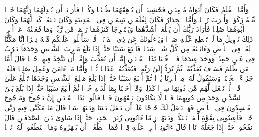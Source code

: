 \stopbuffer
\startbuffer[\q:18:80]
وَأَمَّا ٱلۡغُلَٰمُ فَكَانَ أَبَوَاهُ مُؤۡمِنَیۡنِ فَخَشِینَاۤ أَن یُرۡهِقَهُمَا طُغۡیَٰنࣰا وَكُفۡرࣰا%
\stopbuffer
\startbuffer[\q:18:81]
فَأَرَدۡنَاۤ أَن یُبۡدِلَهُمَا رَبُّهُمَا خَیۡرࣰا مِّنۡهُ زَكَوٰةࣰ وَأَقۡرَبَ رُحۡمࣰا%
\stopbuffer
\startbuffer[\q:18:82]
وَأَمَّا ٱلۡجِدَارُ فَكَانَ لِغُلَٰمَیۡنِ یَتِیمَیۡنِ فِی ٱلۡمَدِینَةِ وَكَانَ تَحۡتَهُۥ كَنزࣱ لَّهُمَا وَكَانَ أَبُوهُمَا صَٰلِحࣰا فَأَرَادَ رَبُّكَ أَن یَبۡلُغَاۤ أَشُدَّهُمَا وَیَسۡتَخۡرِجَا كَنزَهُمَا رَحۡمَةࣰ مِّن رَّبِّكَۚ وَمَا فَعَلۡتُهُۥ عَنۡ أَمۡرِیۚ ذَٰلِكَ تَأۡوِیلُ مَا لَمۡ تَسۡطِع عَّلَیۡهِ صَبۡرࣰا%
\stopbuffer
\startbuffer[\q:18:83]
وَیَسۡءَلُونَكَ عَن ذِی ٱلۡقَرۡنَیۡنِۖ قُلۡ سَأَتۡلُوا۟ عَلَیۡكُم مِّنۡهُ ذِكۡرًا%
\stopbuffer
\startbuffer[\q:18:84]
إِنَّا مَكَّنَّا لَهُۥ فِی ٱلۡأَرۡضِ وَءَاتَیۡنَٰهُ مِن كُلِّ شَیۡءࣲ سَبَبࣰا%
\stopbuffer
\startbuffer[\q:18:85]
فَأَتۡبَعَ سَبَبًا%
\stopbuffer
\startbuffer[\q:18:86]
حَتَّىٰۤ إِذَا بَلَغَ مَغۡرِبَ ٱلشَّمۡسِ وَجَدَهَا تَغۡرُبُ فِی عَیۡنٍ حَمِئَةࣲ وَوَجَدَ عِندَهَا قَوۡمࣰاۖ قُلۡنَا یَٰذَا ٱلۡقَرۡنَیۡنِ إِمَّاۤ أَن تُعَذِّبَ وَإِمَّاۤ أَن تَتَّخِذَ فِیهِمۡ حُسۡنࣰا%
\stopbuffer
\startbuffer[\q:18:87]
قَالَ أَمَّا مَن ظَلَمَ فَسَوۡفَ نُعَذِّبُهُۥ ثُمَّ یُرَدُّ إِلَىٰ رَبِّهِۦ فَیُعَذِّبُهُۥ عَذَابࣰا نُّكۡرࣰا%
\stopbuffer
\startbuffer[\q:18:88]
وَأَمَّا مَنۡ ءَامَنَ وَعَمِلَ صَٰلِحࣰا فَلَهُۥ جَزَاۤءً ٱلۡحُسۡنَىٰۖ وَسَنَقُولُ لَهُۥ مِنۡ أَمۡرِنَا یُسۡرࣰا%
\stopbuffer
\startbuffer[\q:18:89]
ثُمَّ أَتۡبَعَ سَبَبًا%
\stopbuffer
\startbuffer[\q:18:90]
حَتَّىٰۤ إِذَا بَلَغَ مَطۡلِعَ ٱلشَّمۡسِ وَجَدَهَا تَطۡلُعُ عَلَىٰ قَوۡمࣲ لَّمۡ نَجۡعَل لَّهُم مِّن دُونِهَا سِتۡرࣰا%
\stopbuffer
\startbuffer[\q:18:91]
كَذَٰلِكَۖ وَقَدۡ أَحَطۡنَا بِمَا لَدَیۡهِ خُبۡرࣰا%
\stopbuffer
\startbuffer[\q:18:92]
ثُمَّ أَتۡبَعَ سَبَبًا%
\stopbuffer
\startbuffer[\q:18:93]
حَتَّىٰۤ إِذَا بَلَغَ بَیۡنَ ٱلسَّدَّیۡنِ وَجَدَ مِن دُونِهِمَا قَوۡمࣰا لَّا یَكَادُونَ یَفۡقَهُونَ قَوۡلࣰا%
\stopbuffer
\startbuffer[\q:18:94]
قَالُوا۟ یَٰذَا ٱلۡقَرۡنَیۡنِ إِنَّ یَأۡجُوجَ وَمَأۡجُوجَ مُفۡسِدُونَ فِی ٱلۡأَرۡضِ فَهَلۡ نَجۡعَلُ لَكَ خَرۡجًا عَلَىٰۤ أَن تَجۡعَلَ بَیۡنَنَا وَبَیۡنَهُمۡ سَدࣰّا%
\stopbuffer
\startbuffer[\q:18:95]
قَالَ مَا مَكَّنِّی فِیهِ رَبِّی خَیۡرࣱ فَأَعِینُونِی بِقُوَّةٍ أَجۡعَلۡ بَیۡنَكُمۡ وَبَیۡنَهُمۡ رَدۡمًا%
\stopbuffer
\startbuffer[\q:18:96]
ءَاتُونِی زُبَرَ ٱلۡحَدِیدِۖ حَتَّىٰۤ إِذَا سَاوَىٰ بَیۡنَ ٱلصَّدَفَیۡنِ قَالَ ٱنفُخُوا۟ۖ حَتَّىٰۤ إِذَا جَعَلَهُۥ نَارࣰا قَالَ ءَاتُونِیۤ أُفۡرِغۡ عَلَیۡهِ قِطۡرࣰا%
\stopbuffer
\startbuffer[\q:18:97]
فَمَا ٱسۡطَٰعُوۤا۟ أَن یَظۡهَرُوهُ وَمَا ٱسۡتَطَٰعُوا۟ لَهُۥ نَقۡبࣰا%
\stopbuffer
\startbuffer[\q:18:98]
